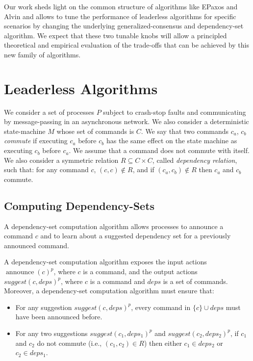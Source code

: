 Our work sheds light on the common structure of algorithms like EPaxos and Alvin and allows to tune the performance of leaderless algorithms for specific scenarios by changing the underlying generalized-consensus and dependency-set algorithm. 
We expect that these two tunable knobs will allow a principled theoretical and empirical evaluation of the trade-offs that can be achieved by this new family of algorithms.

\section{Leaderless Algorithms}

We consider a set of processes $P$ subject to crash-stop faults and communicating by message-passing in an asynchronous network.
We also consider a deterministic state-machine $M$ whose set of commands is $C$. 
We say that two commands $c_a$, $c_b$ \textit{commute} if executing $c_a$ before $c_b$ has the same effect on the state machine as executing $c_b$ before $c_a$. We assume that a command does not commute with itself.
We also consider a symmetric relation $R \subseteq C\times C$, called \textit{dependency relation}, such that: for any command $c$, $\left( c,c \right)\notin R$, and if $\left( c_a,c_b \right)\notin R$ then $c_a$ and $c_b$ commute. 




\subsection{Computing Dependency-Sets}

A dependency-set computation algorithm allows processes to announce a command $c$ and to learn about a suggested dependency set for a previously announced command.

A dependency-set computation algorithm exposes the input actions ${\operatorname{announce}\left( c \right)}^p$, where $c$ is a command, and the output actions ${suggest\left( c, deps \right)}^p$, where $c$ is a command and $deps$ is a set of commands.
Moreover, a dependency-set computation algorithm must ensure that:
\begin{itemize}[noitemsep,nolistsep]
    \item For any suggestion ${suggest\left( c, deps \right)}^p$, every command in $\{c\}\cup deps$ must have been announced before.
    \item For any two suggestions $suggest\left( c_1, deps_1 \right)^p$ and $suggest\left( c_2, deps_2 \right)^p$,  if $c_1$ and $c_2$ do not commute (i.e., $\left( c_1,c_2 \right) \in R$) then either $c_1\in deps_2$ or $c_2 \in deps_1$.
\end{itemize}

